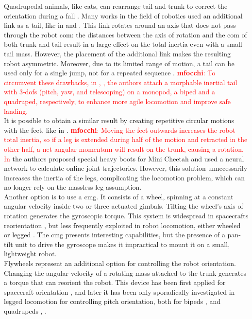 \documentclass[sensors,article,submit,pdftex,moreauthors]{Definitions/mdpi}
\newcommand{\MF}[1]{\textcolor{red}{\textbf{mfocchi}: #1}}
\begin{document}
Quadrupedal animals, like cats, can rearrange tail and trunk to correct the orientation during a fall \cite{kane1969dynamical}.
Many works in the field of robotics used an additional link as a tail, like in \cite{chu2019null} and \cite{wenger2016frontal}.
This link rotates around an axis that does not pass through the robot \gls{com}: the distances between the axis of rotation and the \gls{com} of both trunk and tail result in a large effect on the total inertia even with a small tail mass.
However, the placement of the additional link makes the resulting robot asymmetric. Moreover, due to its limited range of motion, a tail can be used only for a single jump, not for a repeated sequence \cite{johnson2012tail}.
\MF{To circumvent these drawbacks, in \cite{an2022design}, \cite{an2020development}, \cite{tang2022towards} the authors attach a morphable inertial tail with 3-\gls{dofs} (pitch, yaw, and telescoping) on a monopod, a biped and a quadruped, respectively, to enhance more agile locomotion and improve safe landing.}
\\
It is possible to obtain a similar result by creating repetitive circular motions with the feet, like in \cite{hoffman2021exploiting}. \MF{Moving the feet outwards increases the robot total inertia, so if a leg is extended during half of the motion and retracted in the other half, a net angular momentum will result on the trunk, causing a rotation. In \cite{kurtz2022mini}} the authors proposed special heavy boots for Mini Cheetah and used a neural network to calculate online joint trajectories. However, this solution unnecessarily increases the inertia of the legs, complicating the locomotion problem, which can no longer rely on the massless leg assumption. \\ 
Another option is to use a \gls{cmg}.
It consists of a wheel, spinning at a constant angular velocity inside two or three actuated gimbals.
Tilting the wheel's axis of rotation generates the gyroscopic torque.
This system is widespread in spacecrafts reorientation \cite{yoon2002spacecraft}, but less frequently exploited in robot locomotion, either wheeled \cite{brown1996single} or legged \cite{mikhalkov2021gyrubot}.
The \gls{cmg} presents interesting capabilities, but the presence of a pan-tilt unit to drive the gyroscope makes it impractical to mount it on a small, lightweight robot.\\
Flywheels represent an additional option for controlling the robot orientation.
Changing the angular velocity of a rotating mass attached to the trunk generates a torque that can reorient the robot. This device has been first applied for spacecraft orientation \cite{oland2009reaction}, and later it has been only sporadically investigated in legged locomotion for controlling pitch orientation, both for bipeds \cite{Brown2016}, \cite{xiong2020sequential} and quadrupeds \cite{kolvenbach2019towards}, \cite{vasilopoulos2016quadruped}.
\end{document}
